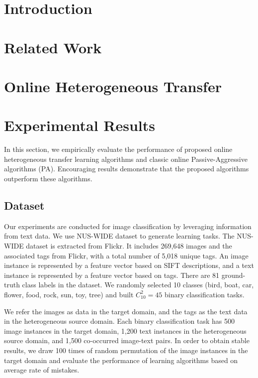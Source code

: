 \documentclass[twocolumn]{article}
\begin{document}
\section{Introduction}

\section{Related Work}

\section{Online Heterogeneous Transfer}

\section{Experimental Results}

In this section, we empirically evaluate the performance of proposed online heterogeneous transfer learning algorithms and classic online Passive-Aggressive algorithms (PA).
Encouraging results demonstrate that the proposed algorithms outperform these algorithms.

\subsection{Dataset}
Our experiments are conducted for image classification by leveraging information from text data.
We use NUS-WIDE dataset to generate learning tasks.
The NUS-WIDE dataset is extracted from Flickr.
It includes 269,648 images and the associated tags from Flickr, with a total number of 5,018 unique tags.
An image instance is represented by a feature vector based on SIFT descriptions, and a text instance is represented by a feature vector based on tags.
There are 81 ground-truth class labels in the dataset.
We randomly selected 10 classes (bird, boat, car, flower, food, rock, sun, toy, tree) and built $C_{10}^{2} = 45$ binary classification tasks.

We refer the images as data in the target domain, and the tags as the text data in the heterogeneous source domain.
Each binary classification task has 500 image instances in the target domain, 1,200 text instances in the heterogeneous source domain, and 1,500 co-occurred image-text pairs.
In order to obtain stable results, we draw 100 times of random permutation of the image instances in the target domain and evaluate the performance of learning algorithms based on average rate of mistakes.
\end{document}
